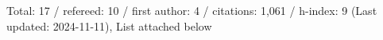 Total: 17 / refereed: 10 / first author: 4 / citations: 1,061 / h-index: 9 (Last updated: 2024-11-11), List attached below